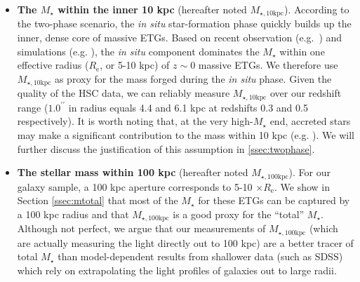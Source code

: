 \documentclass[a4paper,fleqn,usenatbib]{mnras}
\def\arcsec{{\prime\prime}}
\def\mstar{{$M_{\star}$}}
\def\minn{{$M_{\star,10\mathrm{kpc}}$}}
\def\mtot{{$M_{\star,100\mathrm{kpc}}$}}
\begin{document}
    \begin{itemize} 
       
        \item \textbf{The \mstar{} within the inner 10 kpc} 
            (hereafter noted \minn{}). 
            According to the two-phase scenario, the \textit{in situ} star-formation 
            phase quickly builds up the inner, dense core of massive ETGs.  
            Based on recent observation (e.g.~\citealt{vanDokkum2010}) and 
            simulations (e.g. \citealt{RodriguezGomez2016}), the \textit{in situ} 
            component dominates the \mstar{} within one effective radius 
            ($R_{\mathrm{e}}$, or 5-10 kpc) of $z{\sim}0$ massive ETGs.
            We therefore use \minn{} as proxy for the mass forged during the 
            \textit{in situ} phase. 
            Given the quality of the HSC data, we can reliably measure \minn{} over 
            our redshift range ($1.0^{\arcsec}$ in radius equals 4.4 and 6.1 kpc 
            at redshifts 0.3 and 0.5 respectively).  
            It is worth noting that, at the very high-\mstar{} end, accreted stars 
            may make a significant contribution to the mass within 10 kpc 
            (e.g. \citealt{RodriguezGomez2016}). 
            We will further discuss the justification of this assumption in 
            \ref{ssec:twophase}.
            
        \item \textbf{The stellar mass within 100 kpc} 
            (hereafter noted \mtot{}). 
            For our galaxy sample, a 100 kpc aperture corresponds to 5-10 
            $\times R_{\mathrm{e}}$. 
            We show in Section \ref{ssec:mtotal} that most of the \mstar{} for 
            these ETGs can be captured by a 100 kpc radius and that \mtot{} is 
            a good proxy for the ``total'' \mstar{}. 
            Although not perfect, we argue that our measurements of \mtot{} (which are 
            actually measuring the light directly out to 100 kpc) are a better tracer 
            of total \mstar{} than model-dependent results from shallower data 
            (such as SDSS) which rely on extrapolating the light profiles of galaxies 
            out to large radii.
            
       \end{itemize}
       
    
\end{document}
